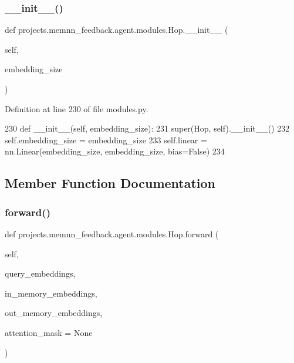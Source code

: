 \subsubsection{\texorpdfstring{\+\_\+\+\_\+init\+\_\+\+\_\+()}{\_\_init\_\_()}}
{\footnotesize\ttfamily def projects.\+memnn\+\_\+feedback.\+agent.\+modules.\+Hop.\+\_\+\+\_\+init\+\_\+\+\_\+ (\begin{DoxyParamCaption}\item[{}]{self,  }\item[{}]{embedding\+\_\+size }\end{DoxyParamCaption})}



Definition at line 230 of file modules.\+py.


\begin{DoxyCode}
230     \textcolor{keyword}{def }\_\_init\_\_(self, embedding\_size):
231         super(Hop, self).\_\_init\_\_()
232         self.embedding\_size = embedding\_size
233         self.linear = nn.Linear(embedding\_size, embedding\_size, bias=\textcolor{keyword}{False})
234 
\end{DoxyCode}


\subsection{Member Function Documentation}
\mbox{\label{classprojects_1_1memnn__feedback_1_1agent_1_1modules_1_1Hop_a49bc88135a02e336541fba3798321df8}} 
\subsubsection{\texorpdfstring{forward()}{forward()}}
{\footnotesize\ttfamily def projects.\+memnn\+\_\+feedback.\+agent.\+modules.\+Hop.\+forward (\begin{DoxyParamCaption}\item[{}]{self,  }\item[{}]{query\+\_\+embeddings,  }\item[{}]{in\+\_\+memory\+\_\+embeddings,  }\item[{}]{out\+\_\+memory\+\_\+embeddings,  }\item[{}]{attention\+\_\+mask = {\ttfamily None} }\end{DoxyParamCaption})}



